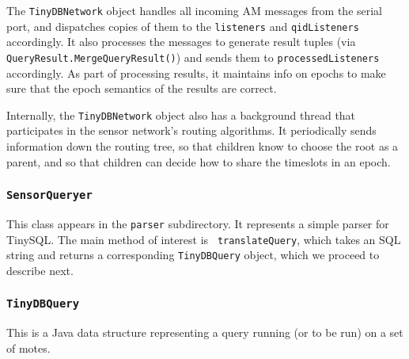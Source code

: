\documentclass[11pt]{article}
\begin{document}
  The {\tt TinyDBNetwork} object handles all incoming
  AM messages from the
  serial port, and dispatches copies of them to the {\tt listeners}
  and {\tt qidListeners} accordingly.  It also processes the messages
  to generate result tuples (via {\tt QueryResult.MergeQueryResult()})
  and sends them to {\tt processedListeners} accordingly.  As part of
  processing results, it maintains info on epochs to make sure that
  the epoch semantics of the results are correct.

  Internally, the {\tt TinyDBNetwork} object also has a background thread
  that participates in the sensor network's routing algorithms.  It
  periodically sends information down the routing tree, so that
  children know to choose the root as a parent, and so that children
  can decide how to share the timeslots in an
  epoch.  

\subsubsection{\tt SensorQueryer}
This class appears in the {\tt parser} subdirectory.  It represents a
simple parser for TinySQL.  The main method of interest is {\tt
translateQuery}, which takes an SQL string and returns a corresponding
{\tt TinyDBQuery} object, which we proceed to describe next.

\subsubsection{\tt TinyDBQuery} 
\label{sec:tinydbquery}
This is a Java data structure representing a
    query running (or to be run) on a set of motes.
    
\end{document}
